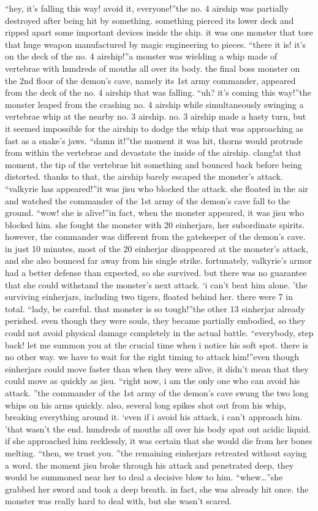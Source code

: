 “hey, it’s falling this way! avoid it, everyone!”the no.
 4 airship was partially destroyed after being hit by something.
 something pierced its lower deck and ripped apart some important devices inside the ship.
 it was one monster that tore that huge weapon manufactured by magic engineering to pieces.
“there it is! it’s on the deck of the no.
 4 airship!”a monster was wielding a whip made of vertebrae with hundreds of mouths all over its body.
the final boss monster on the 2nd floor of the demon’s cave, namely its 1st army commander, appeared from the deck of the no.
 4 airship that was falling.
“uh? it’s coming this way!”the monster leaped from the crashing no.
 4 airship while simultaneously swinging a vertebrae whip at the nearby no.
 3 airship.
no.
 3 airship made a hasty turn, but it seemed impossible for the airship to dodge the whip that was approaching as fast as a snake’s jaws.
“damn it!”the moment it was hit, thorns would protrude from within the vertebrae and devastate the inside of the airship.
clang!at that moment, the tip of the vertebrae hit something and bounced back before being distorted.
 thanks to that, the airship barely escaped the monster’s attack.
“valkyrie has appeared!”it was jisu who blocked the attack.
 she floated in the air and watched the commander of the 1st army of the demon’s cave fall to the ground.
“wow! she is alive!”in fact, when the monster appeared, it was jisu who blocked him.
 she fought the monster with 20 einherjars, her subordinate spirits.
however, the commander was different from the gatekeeper of the demon’s cave.
 in just 10 minutes, most of the 20 einherjar disappeared at the monster’s attack, and she also bounced far away from his single strike.
fortunately, valkyrie’s armor had a better defense than expected, so she survived.
 but there was no guarantee that she could withstand the monster’s next attack.
‘i can’t beat him alone.
’the surviving einherjars, including two tigers, floated behind her.
 there were 7 in total.
“lady, be careful.
 that monster is so tough!”the other 13 einherjar already perished.
 even though they were souls, they became partially embodied, so they could not avoid physical damage completely in the actual battle.
“everybody, step back! let me summon you at the crucial time when i notice his soft spot.
 there is no other way.
 we have to wait for the right timing to attack him!”even though einherjars could move faster than when they were alive, it didn’t mean that they could move as quickly as jisu.
“right now, i am the only one who can avoid his attack.
”the commander of the 1st army of the demon’s cave swung the two long whips on his arms quickly.
 also, several long spikes shot out from his whip, breaking everything around it.
‘even if i avoid his attack, i can’t approach him.
’that wasn’t the end.
 hundreds of mouths all over his body spat out acidic liquid.
 if she approached him recklessly, it was certain that she would die from her bones melting.
“then, we trust you.
”the remaining einherjars retreated without saying a word.
 the moment jisu broke through his attack and penetrated deep, they would be summoned near her to deal a decisive blow to him.
“whew…”she grabbed her sword and took a deep breath.
 in fact, she was already hit once.
the monster was really hard to deal with, but she wasn’t scared.


